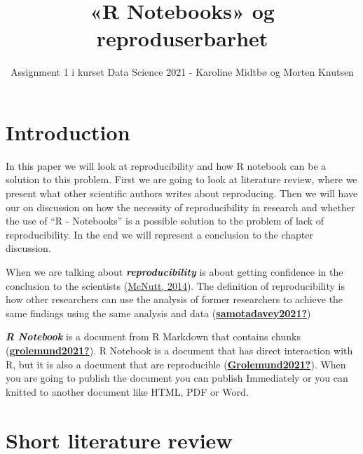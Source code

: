 \documentclass[
  12pt,
  norsk,
]{article}
\title{«R Notebooks» og reproduserbarhet}
\author{Assignment 1 i kurset Data Science 2021 - Karoline Midtbø og
Morten Knutsen}
\date{}
\begin{document}
\maketitle

\hypertarget{introduction}{%
\section{Introduction}\label{introduction}}

In this paper we will look at reproducibility and how R notebook can be
a solution to this problem. First we are going to look at literature
review, where we present what other scientific authors writes about
reproducing. Then we will have our on discussion on how the necessity of
reproducibility in research and whether the use of ``R - Notebooks'' is
a possible solution to the problem of lack of reproducibility. In the
end we will represent a conclusion to the chapter discussion.

When we are talking about \textbf{\emph{reproducibility}} is about
getting confidence in the conclusion to the scientists
(\protect\hyperlink{ref-mcnutt2014}{McNutt, 2014}). The definition of
reproducibility is how other researchers can use the analysis of former
researchers to achieve the same findings using the same analysis and
data
(\protect\hyperlink{ref-samotadavey2021}{\textbf{samotadavey2021?}})

\textbf{\emph{R Notebook}} is a document from R Markdown that contains
chunks (\protect\hyperlink{ref-grolemund2021}{\textbf{grolemund2021?}}).
R Notebook is a document that has direct interaction with R, but it is
also a document that are reproducible
(\protect\hyperlink{ref-Grolemund2021}{\textbf{Grolemund2021?}}). When
you are going to publish the document you can publish Immediately or you
can knitted to another document like HTML, PDF or Word.

\hypertarget{short-literature-review}{%
\section{Short literature review}\label{short-literature-review}}
\end{document}
